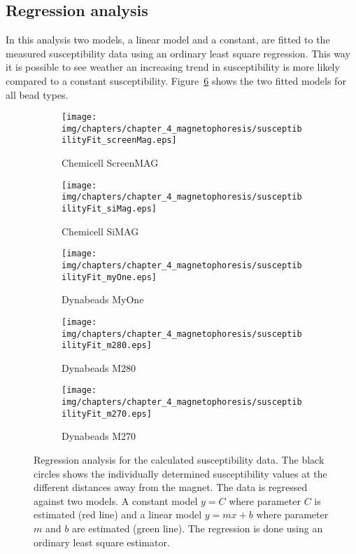 \subsection{Regression analysis}\label{subsec:regressionAnalysis}
In this analysis two models, a linear model and a constant, are fitted to the measured susceptibility data using an ordinary least square regression. This way it is possible to see weather an increasing trend in susceptibility is more likely compared to a constant susceptibility. Figure~\ref{fig:susceptibilityRegressionFit} shows the two fitted models for all bead types.

\begin{figure}[htb]
\begin{subfigure}[b]{.48\linewidth}
\texttt{[image: img/chapters/chapter\_4\_magnetophoresis/susceptibilityFit\_screenMag.eps]}
\caption{Chemicell ScreenMAG}\label{fig:susFit_ScreenMag}
\end{subfigure}
\hfill
\begin{subfigure}[b]{.48\linewidth}
\texttt{[image: img/chapters/chapter\_4\_magnetophoresis/susceptibilityFit\_siMag.eps]}
\caption{Chemicell SiMAG}\label{fig:susFit_SiMag}
\end{subfigure}
\begin{subfigure}[b]{.48\linewidth}
\texttt{[image: img/chapters/chapter\_4\_magnetophoresis/susceptibilityFit\_myOne.eps]}
\caption{Dynabeads MyOne}\label{fig:susFit_MyOne}
\end{subfigure}
\hfill
\begin{subfigure}[b]{.48\linewidth}
\texttt{[image: img/chapters/chapter\_4\_magnetophoresis/susceptibilityFit\_m280.eps]}
\caption{Dynabeads M280}\label{fig:susFit_M280}
\end{subfigure}
\begin{subfigure}[b]{.48\linewidth}
\texttt{[image: img/chapters/chapter\_4\_magnetophoresis/susceptibilityFit\_m270.eps]}
\caption{Dynabeads M270}\label{fig:susFit_M270}
\end{subfigure}
\caption[Regression of susceptibility for two different models]{Regression analysis for the calculated susceptibility data. The black circles shows the individually determined susceptibility values at the different distances away from the magnet. The data is regressed against two models. A constant model $y=C$ where parameter $C$ is estimated (red line) and a linear model $y=mx+b$ where parameter $m$ and $b$ are estimated (green line). The regression is done using an ordinary least square estimator.}
\label{fig:susceptibilityRegressionFit}
\end{figure}


